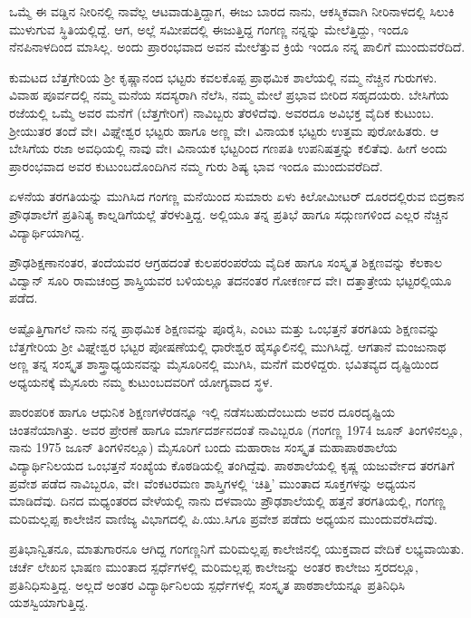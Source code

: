 {ಒಮ್ಮೆ ಈ ವಡ್ಡಿನ ನೀರಿನಲ್ಲಿ ನಾವೆಲ್ಲ ಆಟವಾಡುತ್ತಿದ್ದಾಗ, ಈಜು ಬಾರದ ನಾನು, ಆಕಸ್ಮಿಕವಾಗಿ ನೀರಿನಾಳದಲ್ಲಿ ಸಿಲುಕಿ ಮುಳುಗುವ ಸ್ಥಿತಿಯಲ್ಲಿದ್ದೆ. ಆಗ, ಅಲ್ಲೆ ಸಮೀಪದಲ್ಲಿ ಈಜುತ್ತಿದ್ದ ಗಂಗಣ್ಣ ನನ್ನನ್ನು ಮೇಲೆತ್ತಿದ್ದು, ಇಂದೂ ನೆನಪಿನಾಳದಿಂದ ಮಾಸಿಲ್ಲ. ಅಂದು ಪ್ರಾರಂಭವಾದ ಅವನ ಮೇಲೆತ್ತುವ ಕ್ರಿಯೆ ಇಂದೂ ನನ್ನ ಪಾಲಿಗೆ ಮುಂದುವರೆದಿದೆ.

ಕುಮಟದ ಬೆತ್ತಗೇರಿಯ ಶ್ರೀ ಕೃಷ್ಣಾನಂದ ಭಟ್ಟರು ಕವಲಕೊಪ್ಪ ಪ್ರಾಥಮಿಕ ಶಾಲೆಯಲ್ಲಿ ನಮ್ಮ ನೆಚ್ಚಿನ ಗುರುಗಳು. ವಿವಾಹ ಪೂರ್ವದಲ್ಲಿ ನಮ್ಮ ಮನೆಯ ಸದಸ್ಯರಾಗಿ ನೆಲೆಸಿ, ನಮ್ಮ ಮೇಲೆ ಪ್ರಭಾವ ಬೀರಿದ ಸಹೃದಯರು. ಬೇಸಿಗೆಯ ರಜೆಯಲ್ಲಿ ಒಮ್ಮೆ ಅವರ ಮನೆಗೆ (ಬೆತ್ತಗೇರಿಗೆ) ನಾವಿಬ್ಬರು ತೆರಳಿದೆವು. ಅವರದೂ ಅವಿಭಕ್ತ ವೈದಿಕ ಕುಟುಂಬ. ಶ್ರೀಯುತರ ತಂದೆ ವೇ। ವಿಘ್ನೇಶ್ವರ ಭಟ್ಟರು ಹಾಗೂ ಅಣ್ಣ ವೇ। ವಿನಾಯಕ ಭಟ್ಟರು ಉತ್ತಮ ಪುರೋಹಿತರು. ಆ ಬೇಸಿಗೆಯ ರಜಾ ಅವಧಿಯಲ್ಲಿ ನಾವು ವೇ। ವಿನಾಯಕ ಭಟ್ಟರಿಂದ ಗಣಪತಿ ಉಪನಿಷತ್ತನ್ನು ಕಲಿತೆವು. ಹೀಗೆ ಅಂದು ಪ್ರಾರಂಭವಾದ ಅವರ ಕುಟುಂಬದೊಂದಿಗಿನ ನಮ್ಮ ಗುರು  \enginline{-}  ಶಿಷ್ಯ ಭಾವ ಇಂದೂ ಮುಂದುವರೆದಿದೆ. 

ಏಳನೆಯ ತರಗತಿಯನ್ನು ಮುಗಿಸಿದ ಗಂಗಣ್ಣ ಮನೆಯಿಂದ ಸುಮಾರು ಏಳು ಕಿಲೋಮೀಟರ್ ದೂರದಲ್ಲಿರುವ ಬಿದ್ರಕಾನ ಪ್ರೌಢಶಾಲೆಗೆ ಪ್ರತಿನಿತ್ಯ ಕಾಲ್ನಡಿಗೆಯಲ್ಲೆ ತೆರಳುತ್ತಿದ್ದ. ಅಲ್ಲಿಯೂ ತನ್ನ ಪ್ರತಿಭೆ ಹಾಗೂ ಸದ್ಗುಣಗಳಿಂದ ಎಲ್ಲರ ನೆಚ್ಚಿನ ವಿದ್ಯಾರ್ಥಿಯಾಗಿದ್ದ.

ಪ್ರೌಢಶಿಕ್ಷಣಾನಂತರ, ತಂದೆಯವರ ಆಗ್ರಹದಂತೆ ಕುಲಪರಂಪರೆಯ ವೈದಿಕ ಹಾಗೂ ಸಂಸ್ಕೃತ ಶಿಕ್ಷಣವನ್ನು ಕೆಲಕಾಲ ವಿದ್ವಾನ್ ಸೂರಿ ರಾಮಚಂದ್ರ ಶಾಸ್ತ್ರಿಯವರ ಬಳಿಯಲ್ಲೂ ತದನಂತರ ಗೋಕರ್ಣದ ವೇ। ದತ್ತಾತ್ರೇಯ ಭಟ್ಟರಲ್ಲಿಯೂ ಪಡೆದ.

ಅಷ್ಟೊತ್ತಿಗಾಗಲೆ ನಾನು ನನ್ನ ಪ್ರಾಥಮಿಕ ಶಿಕ್ಷಣವನ್ನು ಪೂರೈಸಿ, ಎಂಟು ಮತ್ತು ಒಂಭತ್ತನೆ ತರಗತಿಯ ಶಿಕ್ಷಣವನ್ನು ಬೆತ್ತಗೇರಿಯ ಶ್ರೀ ವಿಘ್ನೇಶ್ವರ ಭಟ್ಟರ ಪೋಷಣೆಯಲ್ಲಿ ಧಾರೇಶ್ವರ ಹೈಸ್ಕೂಲಿನಲ್ಲಿ ಮುಗಿಸಿದ್ದೆ. ಆಗತಾನೆ ಮಂಜುನಾಥ ಅಣ್ಣ ತನ್ನ ಸಂಸ್ಕೃತ  \enginline{-}   ಶಾಸ್ತ್ರಾಧ್ಯಯನವನ್ನು ಮೈಸೂರಿನಲ್ಲಿ ಮುಗಿಸಿ, ಮನೆಗೆ ಮರಳಿದ್ದರು. ಭವಿತವ್ಯದ ದೃಷ್ಟಿಯಿಂದ ಅಧ್ಯಯನಕ್ಕೆ ಮೈಸೂರು ನಮ್ಮ ಕುಟುಂಬದವರಿಗೆ ಯೋಗ್ಯವಾದ ಸ್ಥಳ.

ಪಾರಂಪರಿಕ ಹಾಗೂ ಆಧುನಿಕ ಶಿಕ್ಷಣಗಳೆರಡನ್ನೂ ಇಲ್ಲಿ ನಡೆಸಬಹುದೆಂಬುದು ಅವರ ದೂರದೃಷ್ಟಿಯ ಚಿಂತನೆಯಾಗಿತ್ತು. ಅವರ ಪ್ರೇರಣೆ ಹಾಗೂ ಮಾರ್ಗದರ್ಶನದಂತೆ ನಾವಿಬ್ಬರೂ (ಗಂಗಣ್ಣ 1974 ಜೂನ್ ತಿಂಗಳಿನಲ್ಲೂ, ನಾನು 1975 ಜೂನ್ ತಿಂಗಳಿನಲ್ಲೂ) ಮೈಸೂರಿಗೆ ಬಂದು ಮಹಾರಾಜ ಸಂಸ್ಕೃತ ಮಹಾಪಾಠಶಾಲೆಯ ವಿದ್ಯಾರ್ಥಿನಿಲಯದ ಒಂಭತ್ತನೆ ಸಂಖ್ಯೆಯ ಕೊಠಡಿಯಲ್ಲಿ ತಂಗಿದ್ದೆವು. ಪಾಠಶಾಲೆಯಲ್ಲಿ ಕೃಷ್ಣ ಯಜುರ್ವೇದ ತರಗತಿಗೆ ಪ್ರವೇಶ ಪಡೆದ ನಾವಿಬ್ಬರೂ, ವೇ। ವೆಂಕಟರಮಣ ಶಾಸ್ತ್ರಿಗಳಲ್ಲಿ ‘ಚಿತ್ತಿ’ ಮುಂತಾದ ಸೂಕ್ತಗಳನ್ನು ಅಧ್ಯಯನ ಮಾಡಿದೆವು. ದಿನದ ಮಧ್ಯಂತರದ ವೇಳೆಯಲ್ಲಿ ನಾನು ದಳವಾಯಿ ಪ್ರೌಢಶಾಲೆಯಲ್ಲಿ ಹತ್ತನೆ ತರಗತಿಯಲ್ಲಿ, ಗಂಗಣ್ಣ ಮರಿಮಲ್ಲಪ್ಪ ಕಾಲೇಜಿನ ವಾಣಿಜ್ಯ ವಿಭಾಗದಲ್ಲಿ ಪಿ.ಯು.ಸಿಗೂ ಪ್ರವೇಶ ಪಡೆದು ಅಧ್ಯಯನ ಮುಂದುವರೆಸಿದೆವು.

ಪ್ರತಿಭಾನ್ವಿತನೂ, ಮಾತುಗಾರನೂ ಆಗಿದ್ದ ಗಂಗಣ್ಣನಿಗೆ ಮರಿಮಲ್ಲಪ್ಪ ಕಾಲೇಜಿನಲ್ಲಿ ಯುಕ್ತವಾದ ವೇದಿಕೆ ಲಭ್ಯವಾಯಿತು. ಚರ್ಚೆ  \enginline{-}  ಲೇಖನ  \enginline{-}  ಭಾಷಣ ಮುಂತಾದ ಸ್ಪರ್ಧೆಗಳಲ್ಲಿ ಮರಿಮಲ್ಲಪ್ಪ ಕಾಲೇಜನ್ನು ಅಂತರ ಕಾಲೇಜು ಸ್ತರದಲ್ಲೂ, ಪ್ರತಿನಿಧಿಸುತ್ತಿದ್ದ. ಅಲ್ಲದೆ ಅಂತರ ವಿದ್ಯಾರ್ಥಿನಿಲಯ ಸ್ಪರ್ಧೆಗಳಲ್ಲಿ ಸಂಸ್ಕೃತ ಪಾಠಶಾಲೆಯನ್ನೂ ಪ್ರತಿನಿಧಿಸಿ ಯಶಸ್ವಿಯಾಗುತ್ತಿದ್ದ. 

}
